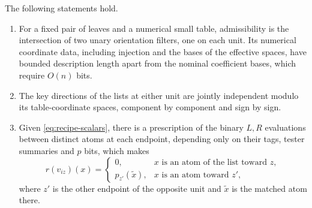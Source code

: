 \begin{lemma}\label{lem:small-tables}
The following statements hold.
\begin{enumerate}[label=\textup{(\roman*)}]
\item For a fixed pair of leaves and a numerical small table,
admissibility is the intersection of two unary orientation
filters, one on each unit.  Its numerical coordinate data,
including injection and the bases of the effective spaces,
have bounded description length apart from the nominal
coefficient bases, which require $O(n)$ bits.
\item The key directions of the lists at either unit are jointly
independent modulo its table-coordinate spaces, component by
component and sign by sign.
\item Given \eqref{eq:recipe-scalars}, there is a prescription of
the binary $L,R$ evaluations between distinct atoms at each
endpoint, depending only on their tags, tester summaries and
$p$ bits, which makes
\begin{equation}\label{eq:recipe-gradients}
 r(v_{iz})(x)=
 \begin{cases}
  0,&x\text{ is an atom of the list toward }z,\\
  p_{z'}(\widetilde x),&x\text{ is an atom toward }z',
 \end{cases}
\end{equation}
where $z'$ is the other endpoint of the opposite unit and
$\widetilde x$ is the matched atom there.
\end{enumerate}
\end{lemma}
